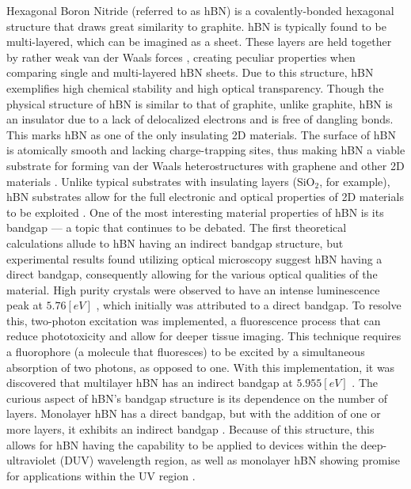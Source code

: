 \documentclass[conference]{IEEEtran}
\begin{document}
Hexagonal Boron Nitride (referred to as hBN) is a covalently-bonded hexagonal structure that draws great similarity to graphite. hBN is typically found to be multi-layered, which can be imagined as a sheet. These layers are held together by rather weak van der Waals forces \cite{jb1}, creating peculiar properties when comparing single and multi-layered hBN sheets. Due to this structure, hBN exemplifies high chemical stability and high optical transparency.
Though the physical structure of hBN is similar to that of graphite, unlike graphite, hBN is an insulator due to a lack of delocalized electrons and is free of dangling bonds. This marks hBN as one of the only insulating 2D materials. The surface of hBN is atomically smooth and lacking charge-trapping sites, thus making hBN a viable substrate for forming van der Waals heterostructures with graphene and other 2D materials \cite{jb2}. Unlike typical substrates with insulating layers (SiO$_2$, for example), hBN substrates allow for the full electronic and optical properties of 2D materials to be exploited \cite{jb1}. 
One of the most interesting material properties of hBN is its bandgap — a topic that continues to be debated. The first theoretical calculations allude to hBN having an indirect bandgap structure, but experimental results found utilizing optical microscopy suggest hBN having a direct bandgap, consequently allowing for the various optical qualities of the material. High purity crystals were observed to have an intense luminescence peak at $5.76[\si{eV}]$ \cite{jb1}, which initially was attributed to a direct bandgap. To resolve this, two-photon excitation was implemented, a fluorescence process that can reduce phototoxicity and allow for deeper tissue imaging. This technique requires a fluorophore (a molecule that fluoresces) to be excited by a simultaneous absorption of two photons, as opposed to one. With this implementation, it was discovered that multilayer hBN has an indirect bandgap at $5.955[\si{eV}]$ \cite{jb2}.
The curious aspect of hBN’s bandgap structure is its dependence on the number of layers. Monolayer hBN has a direct bandgap, but with the addition of one or more layers, it exhibits an indirect bandgap \cite{jb1}. Because of this structure, this allows for hBN having the capability to be applied to devices within the deep-ultraviolet (DUV) wavelength region, as well as monolayer hBN showing promise for applications within the UV region \cite{jb1}.
\end{document}

